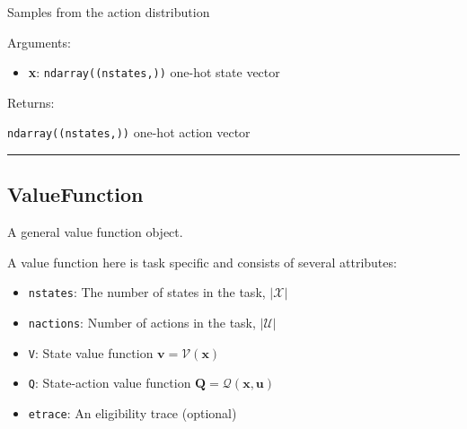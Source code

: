 \begin{Shaded}
\begin{Highlighting}[]
\end{Highlighting}
\end{Shaded}

Samples from the action distribution

Arguments:

\begin{itemize}
\tightlist
\item
  \textbf{x}: \texttt{ndarray((nstates,))} one-hot state vector
\end{itemize}

Returns:

\texttt{ndarray((nstates,))} one-hot action vector

\begin{center}\rule{0.5\linewidth}{\linethickness}\end{center}

\hypertarget{valuefunction}{%
\subsection{ValueFunction}\label{valuefunction}}

\begin{Shaded}
\begin{Highlighting}[]
\end{Highlighting}
\end{Shaded}

A general value function object.

A value function here is task specific and consists of several
attributes:

\begin{itemize}
\tightlist
\item
  \texttt{nstates}: The number of states in the task, \(|\mathcal X|\)
\item
  \texttt{nactions}: Number of actions in the task, \(|\mathcal U|\)
\item
  \texttt{V}: State value function \(\mathbf v = \mathcal V(\mathbf x)\)
\item
  \texttt{Q}: State-action value function
  \(\mathbf Q = \mathcal Q(\mathbf x, \mathbf u)\)
\item
  \texttt{etrace}: An eligibility trace (optional)
\end{itemize}

